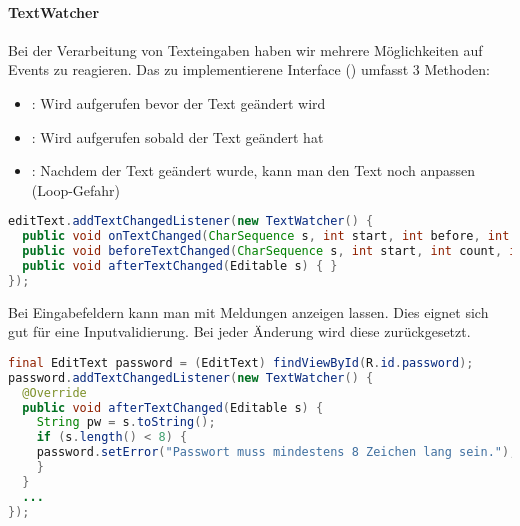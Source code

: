 \paragraph{TextWatcher}
Bei der Verarbeitung von Texteingaben haben wir mehrere Möglichkeiten auf Events zu reagieren. Das zu implementierene Interface () umfasst 3 Methoden:
\begin{itemize}
\item {}: Wird aufgerufen bevor der Text geändert wird
\item {}: Wird aufgerufen sobald der Text geändert hat
\item {}: Nachdem der Text geändert wurde, kann man den Text noch anpassen (Loop-Gefahr)
\end{itemize}
\begin{lstlisting}[language=java]
editText.addTextChangedListener(new TextWatcher() {
  public void onTextChanged(CharSequence s, int start, int before, int count){ }
  public void beforeTextChanged(CharSequence s, int start, int count, int after){ }
  public void afterTextChanged(Editable s) { }
});
\end{lstlisting}
Bei Eingabefeldern kann man mit  Meldungen anzeigen lassen. Dies eignet sich gut für eine Inputvalidierung. Bei jeder Änderung wird diese zurückgesetzt.
\begin{lstlisting}[language=java]
final EditText password = (EditText) findViewById(R.id.password);
password.addTextChangedListener(new TextWatcher() {
  @Override
  public void afterTextChanged(Editable s) {
    String pw = s.toString();
    if (s.length() < 8) {
    password.setError("Passwort muss mindestens 8 Zeichen lang sein.");
    }
  }
  ...
});
\end{lstlisting}
